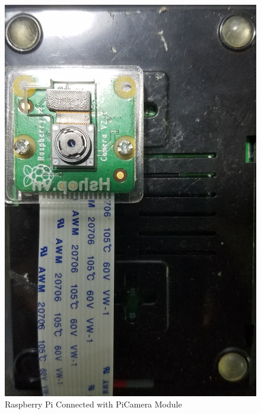   \begin{figure}[!ht]
    \begin{center}
    \includegraphics[scale=0.15]{images/piAndCam.jpg}
    \caption{Raspberry Pi Connected with PiCamera Module}
    \label{fig:piAndCam}
    \end{center}
  \end{figure}


